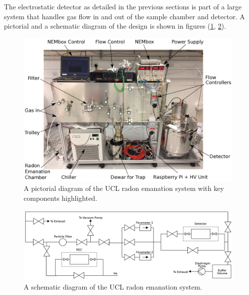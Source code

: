 The electrostatic detector as detailed in the previous sections is part of a large system that handles gas flow in and out of the sample chamber and detector. A pictorial and a schematic diagram of the design is shown in figures (\ref{fig:detector_design_picture}, \ref{fig:detector_design_schematic}).
%
\begin{figure}[]
    \centering
    \includegraphics[scale=0.4]{Chapter_4/Figures/radon_system_design.png}
    \caption[A pictorial diagram of the UCL radon emanation system with key components highlighted.]
    {A pictorial diagram of the UCL radon emanation system with key components highlighted.}
    \label{fig:detector_design_picture}
\end{figure}
%
%
\begin{figure}[]
    \centering
    \includegraphics[scale=0.38]{Chapter_4/Figures/radon_system_pid.png}
    \caption[A schematic diagram of the UCL radon emanation system.]
    {A schematic diagram of the UCL radon emanation system.}
    \label{fig:detector_design_schematic}
\end{figure}
%

